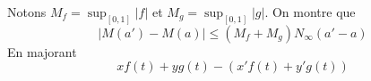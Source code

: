 Notons $M_f=\sup_{[0,1]}|f|$ et $M_g=\sup_{[0,1]}|g|$. On montre que 
\begin{displaymath}
 |M(a')-M(a)|\leq (M_f + M_g)N_{\infty}(a'-a)
\end{displaymath}
 En majorant
\begin{displaymath}
 xf(t)+yg(t)-(x'f(t)+y'g(t))
\end{displaymath}
